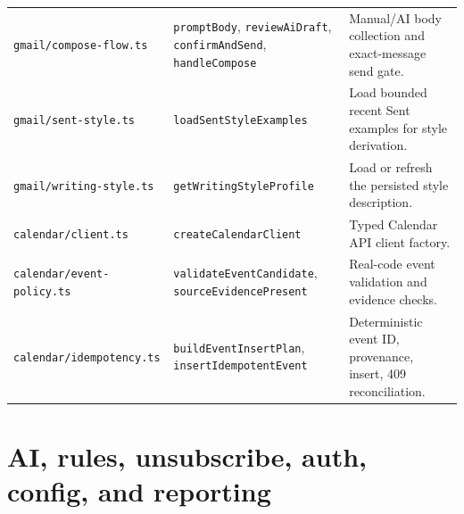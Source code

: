 \documentclass[12pt,oneside]{book}
\newcommand{\code}[1]{\nolinkurl{#1}}
\newcommand{\file}[1]{\nolinkurl{#1}}
\begin{document}
\begin{longtable}{P{3.6cm}P{5.8cm}P{7.0cm}}
\file{gmail/compose-flow.ts} & \code{promptBody}, \code{reviewAiDraft}, \code{confirmAndSend}, \code{handleCompose} & Manual/AI body collection and exact-message send gate. \\
\file{gmail/sent-style.ts} & \code{loadSentStyleExamples} & Load bounded recent Sent examples for style derivation. \\
\file{gmail/writing-style.ts} & \code{getWritingStyleProfile} & Load or refresh the persisted style description. \\
\file{calendar/client.ts} & \code{createCalendarClient} & Typed Calendar API client factory. \\
\file{calendar/event-policy.ts} & \code{validateEventCandidate}, \code{sourceEvidencePresent} & Real-code event validation and evidence checks. \\
\file{calendar/idempotency.ts} & \code{buildEventInsertPlan}, \code{insertIdempotentEvent} & Deterministic event ID, provenance, insert, 409 reconciliation. \\
\bottomrule
\end{longtable}
\endgroup

\section{AI, rules, unsubscribe, auth, config, and reporting}
\end{document}
